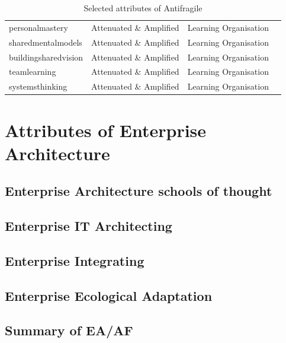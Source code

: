 \begin{table}[!h]
\begin{center}
{\begin{tabular}{@{}llll@{}}
				\Gls{personalmastery} & Attenuated \& Amplified & Learning Organisation & \parencite{Botjes2020} \\
				\Gls{sharedmentalmodels} & Attenuated \& Amplified & Learning Organisation & \parencite{Botjes2020} \\
				\Gls{buildingsharedvision} & Attenuated \& Amplified & Learning Organisation & \parencite{Botjes2020} \\
				\Gls{teamlearning} & Attenuated \& Amplified & Learning Organisation & \parencite{Botjes2020} \\
				\Gls{systemsthinking} & Attenuated \& Amplified & Learning Organisation & \parencite{Botjes2020} \\
				\bottomrule
			\end{tabular}
		}
		\caption{Selected attributes of Antifragile}
	\end{center}
\end{table}

\section{Attributes of Enterprise Architecture}
\label{sec:attributesonea}

\subsection{Enterprise Architecture schools of thought}
\label{sub:enterprisearchitectureschoolsofthought}

\subsection{Enterprise IT Architecting}
\label{sub:enterpriseitarchitecting}

\subsection{Enterprise Integrating}
\label{sub:enterpriseintegrating}

\subsection{Enterprise Ecological Adaptation}
\label{sub:enterpriseecologicaladaptation}





\subsection{Summary of EA/AF}
\label{sub:sfsummaryantifragile}

